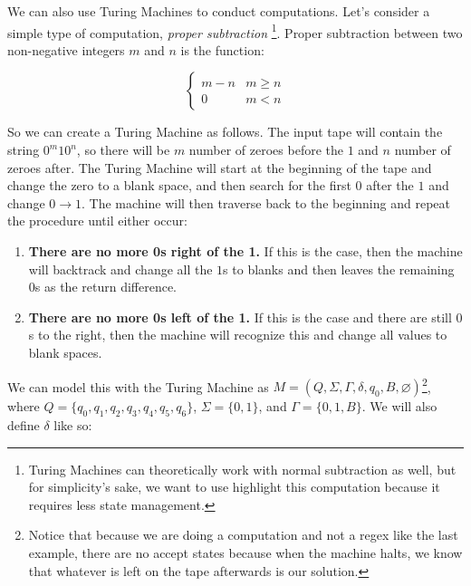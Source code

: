 \documentclass[12pt]{article}
\begin{document}
We can also use Turing Machines to conduct computations. Let's consider a simple type of computation, \textit{proper subtraction} \footnote{Turing Machines can theoretically work with normal subtraction as well, but for simplicity's sake, we want to use highlight this computation because it requires less state management.}. Proper subtraction between two non-negative integers $m$ and $n$ is the function:

\[ \begin{cases} 
      m-n & m\geq n \\
      0 & m<n
   \end{cases}
\]

So we can create a Turing Machine as follows. The input tape will contain the string $0^m10^n$, so there will be $m$ number of zeroes before the $1$ and $n$ number of zeroes after. The Turing Machine will start at the beginning of the tape and change the zero to a blank space, and then search for the first $0$ after the $1$ and change $0 \to 1$. The machine will then traverse back to the beginning and repeat the procedure until either occur:

\begin{enumerate}

\item \textbf{There are no more 0s right of the 1.} If this is the case, then the machine will backtrack and change all the $1$s to blanks and then leaves the remaining $0$s as the return difference. 
\item \textbf{There are no more 0s left of the 1.} If this is the case and there are still $0$s to the right, then the machine will recognize this and change all values to blank spaces.

\end {enumerate}

We can model this with the Turing Machine as $M=(Q,\Sigma, \Gamma, \delta, q_0, B, \varnothing)$\footnote{Notice that because we are doing a computation and not a regex like the last example, there are no accept states because when the machine halts, we know that whatever is left on the tape afterwards is our solution.}, where $Q = \{q_0, q_1, q_2, q_3, q_4, q_5, q_6 \}$, $\Sigma = \{0,1\}$, and $\Gamma = \{0,1,B\}$. We will also define $\delta$ like so:
\end{document}

